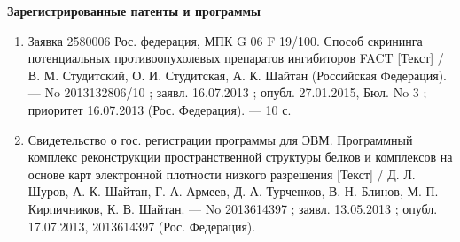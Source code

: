 {{\textbf{Зарегистрированные патенты и программы}

\begin{enumerate}
  \item Заявка 2580006 Рос. федерация, МПК G 06 F 19/100. Способ скрининга потенциальных противоопухолевых препаратов ингибиторов FACT [Текст] / В. М. Студитский, О. И. Студитская, А. К. Шайтан (Российская Федерация). — No 2013132806/10 ; заявл. 16.07.2013 ; опубл. 27.01.2015, Бюл. No 3 ; приоритет 16.07.2013 (Рос. Федерация). — 10 с.
\item Свидетельство о гос. регистрации программы для ЭВМ. Программный комплекс реконструкции пространственной структуры белков и комплексов на основе карт электронной плотности низкого разрешения [Текст] / Д. Л. Шуров, А. К. Шайтан, Г. А. Армеев, Д. А. Турченков, В. Н. Блинов, М. П. Кирпичников, К. В. Шайтан. — No 2013614397 ; заявл. 13.05.2013 ; опубл. 17.07.2013, 2013614397 (Рос. Федерация).
\end{enumerate}

  \begin{refcontext}[labelprefix={}]
      \insertbiblioexternal            %
  \end{refcontext}
  \printbibliography[heading=nobibheading, section=0, env=countexternal, keyword=biblioexternal, resetnumbers=true]%
  }
}
